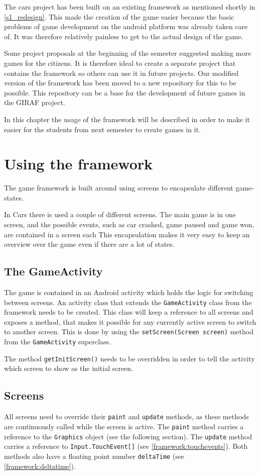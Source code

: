 \label{common_game_framework}
The cars project has been built on an existing framework as mentioned shortly in \cref{s1_redesign}. 
This made the creation of the game easier because the basic problems of game development on the android platform was already taken care of.
It was therefore relatively painless to get to the actual design of the game. 

Some project proposals at the beginning of the semester suggested making more games for the citizens.
It is therefore ideal to create a separate project that contains the framework so others can use it in future projects.
Our modified version of the framework has been moved to a new repository for this to be possible.
This repository can be a base for the development of future games in the GIRAF project.

In this chapter the usage of the framework will be described in order to make it easier for the students from next semester to create games in it.

\section{Using the framework}
The game framework is built around using screens to encapsulate different game-states. 

In Cars there is used a couple of different screens.
The main game is in one screen, and the possible events, such as car crashed, game paused and game won, are contained in a screen each
This encapsulation makes it very easy to keep an overview over the game even if there are a lot of states.

\subsection{The GameActivity}
The game is contained in an Android activity which holds the logic for switching between screens.
An activity class that extends the \lstinline|GameActivity| class from the framework needs to be created.
This class will keep a reference to all screens and exposes a method, that makes it possible for any currently active screen to switch to another screen.
This is done by using the \lstinline|setScreen(Screen screen)| method from the \lstinline|GameActivity| superclass.

The method \lstinline|getInitScreen()| needs to be overridden in order to tell the activity which screen to show as the initial screen.

\subsection{Screens}
All screens need to override their \lstinline|paint| and \lstinline|update| methods, as these methods are continuously called while the screen is active.
The \lstinline|paint| method carries a reference to the \lstinline|Graphics| object (see the following section).
The \lstinline|update| method carries a reference to \lstinline|Input.TouchEvent[]| (see \cref{framework:touchevents}).
Both methods also have a floating point number \lstinline|deltaTime| (see \cref{framework:deltatime}).

